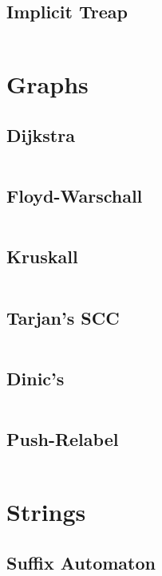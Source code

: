 \documentclass[8pt,a4paper,landscape,oneside]{amsart}
\begin{document}
\begin{multicols*}{2}
\begin{multicols*}{2}
		\subsection{Implicit Treap}
		\inputminted[firstline=16,lastline=57]{c++}{_code/datastructures/implicit_treap.cpp}
		\vfill\null
		\columnbreak
		\vfill\null
	\end{multicols*}
	\section{Graphs}
	\begin{multicols*}{2}
		\subsection{Dijkstra}
		\inputminted[firstline=21,lastline=28]{c++}{_code/graphs/dijkstra.cpp}
		\subsection{Floyd-Warschall}
		\inputminted[firstline=17,lastline=21]{c++}{_code/graphs/floyd_warschall.cpp}
		\subsection{Kruskall}
		\inputminted[firstline=27,lastline=36]{c++}{_code/graphs/kruskall.cpp}
		\vfill\null
		\columnbreak
		\subsection{Tarjan's SCC}
		\inputminted[firstline=27,lastline=39]{c++}{_code/graphs/scc.cpp}
		\subsection{Dinic's}
		\inputminted[firstline=11,lastline=29]{c++}{_code/graphs/dinic.cpp}
		\subsection{Push-Relabel}
		\inputminted[firstline=11,lastline=25]{c++}{_code/graphs/pushrelabel.cpp}
		\vfill\null
	\end{multicols*}
	\vfill\null
	\newpage
	\section{Strings}
	\begin{multicols*}{2}
		\subsection{Suffix Automaton}
		\inputminted[firstline=16,lastline=43]{c++}{_code/strings/suffixAutomaton.cpp}
		\vfill\null
		\columnbreak
		\vfill\null
	\end{multicols*}
	\vfill\null

\end{multicols*}
\end{document}
